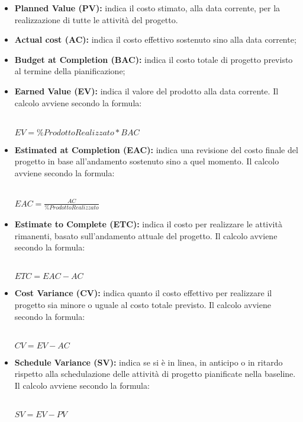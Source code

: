 \begin{itemize}
	\item \textbf{Planned Value (PV):} indica il costo stimato, alla data corrente, per la realizzazione di tutte le attività del progetto.
	\item \textbf{Actual cost (AC):} indica il costo effettivo sostenuto sino alla data corrente;
	\item \textbf{Budget at Completion (BAC):} indica il costo totale di progetto previsto al termine della pianificazione;
	\item \textbf{Earned Value (EV):} indica il valore del prodotto alla data corrente. Il calcolo avviene secondo la formula:\\\\
	\centerline{
		\begin{math}
		EV=\% ProdottoRealizzato*BAC
		\end{math}
	}
	\item \textbf{Estimated at Completion (EAC):} indica una revisione del costo finale del progetto in base all'andamento sostenuto sino a quel momento. Il calcolo avviene secondo la formula:\\\\
	\centerline{
		\begin{math}
		EAC=\frac{AC}{\% ProdottoRealizzato}
		\end{math}
	}
	\item \textbf{Estimate to Complete (ETC):} indica il costo per realizzare le attività rimanenti, basato sull'andamento attuale del progetto. Il calcolo avviene secondo la formula:\\\\
	\centerline{
		\begin{math}
		ETC=EAC-AC
		\end{math}
	}
	\item \textbf{Cost Variance	(CV):} indica quanto il costo effettivo per realizzare il progetto sia minore o uguale al costo totale previsto. Il calcolo avviene secondo la formula:\\\\
	\centerline{
		\begin{math}
		CV=EV-AC
		\end{math}
	}
	\item \textbf{Schedule Variance	(SV):} indica se si è in linea, in anticipo o in ritardo rispetto alla schedulazione delle attività di progetto pianificate nella baseline. Il calcolo avviene secondo la formula:\\\\
	\centerline{
		\begin{math}
		SV=EV-PV
		\end{math}
	}
\end{itemize}

